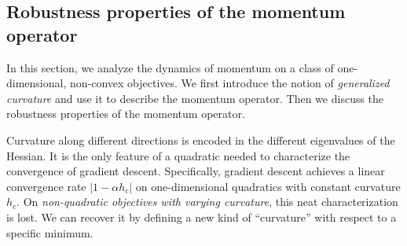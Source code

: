 \documentclass{article} %
\newcommand{\forjian}[1]{{\color{magenta}FOR JIAN: #1}}
\begin{document}

\subsection{Robustness properties of the momentum operator}
\vspace{-0.2em}
\label{sec:robust_properties}
In this section, we analyze the dynamics of momentum on a class of one-dimensional, non-convex objectives.
We first introduce the notion of {\em generalized curvature} and use it to describe the momentum operator.
Then we discuss the robustness properties of the momentum operator.

Curvature along different directions is encoded in the different eigenvalues of the Hessian. 
It is the only feature of a quadratic needed to characterize the convergence of gradient descent. Specifically, gradient descent achieves a linear convergence rate $|1 - \alpha h_c|$ on one-dimensional quadratics with constant curvature $h_c$. 
On \emph{non-quadratic objectives with varying curvature}, this neat characterization is lost.
We can recover it by defining a new kind of ``curvature'' with respect to a specific minimum.
\end{document}
